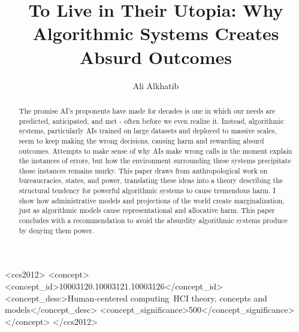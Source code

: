\documentclass[manuscript,screen]{acmart}
\newcommand{\onlyinsubfile}[1]{#1}
\newcommand{\topic}[1]{{\color{blue}{#1}}}
\newcommand{\notinsubfile}[1]{}
\begin{document}
\renewcommand{\notinsubfile}[1]{#1}
\renewcommand{\onlyinsubfile}[1]{}
\renewcommand{\topic}[1]{#1}
\title[To Live in Their Utopia]{To Live in Their Utopia: Why Algorithmic Systems Creates Absurd Outcomes}

\author{Ali Alkhatib}


\renewcommand{\shortauthors}{Alkhatib}

\begin{abstract}
  The promise AI's proponents have made for decades is one in which our needs are predicted, anticipated, and met - often before we even realize it.
  Instead, algorithmic systems, particularly AIs trained on large datasets and deployed to massive scales, seem to keep making the wrong decisions, causing harm and rewarding absurd outcomes.
  Attempts to make sense of why AIs make wrong calls in the moment explain the instances of errors,
  but how the environment surrounding these systems precipitate those instances remains murky.
  This paper draws from anthropological work on bureaucracies, states, and power,
  translating these ideas into a theory describing the structural tendency for powerful algorithmic systems to cause tremendous harm.
  I show how administrative models and projections of the world create marginalization, just as algorithmic models cause representational and allocative harm.
  This paper concludes with a recommendation to avoid the absurdity algorithmic systems produce by denying them power.
\end{abstract}

\begin{CCSXML}
<ccs2012>
   <concept>
       <concept_id>10003120.10003121.10003126</concept_id>
       <concept_desc>Human-centered computing~HCI theory, concepts and models</concept_desc>
       <concept_significance>500</concept_significance>
       </concept>
 </ccs2012>
\end{CCSXML}
\end{document}
